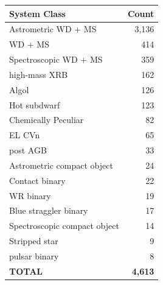\begin{tabular}{lr}
\hline
System Class & Count \\
\hline
Astrometric WD + MS & 3,136 \\
WD + MS & 414 \\
Spectroscopic WD + MS & 359 \\
high-mass XRB & 162 \\
Algol & 126 \\
Hot subdwarf & 123 \\
Chemically Peculiar & 82 \\
EL CVn & 65 \\
post AGB & 33 \\
Astrometric compact object & 24 \\
Contact binary & 22 \\
WR binary & 19 \\
Blue straggler binary & 17 \\
Spectroscopic compact object & 14 \\
Stripped star & 9 \\
pulsar binary & 8 \\
\hline
\textbf{TOTAL} & \textbf{4,613} \\
\hline
\end{tabular}
